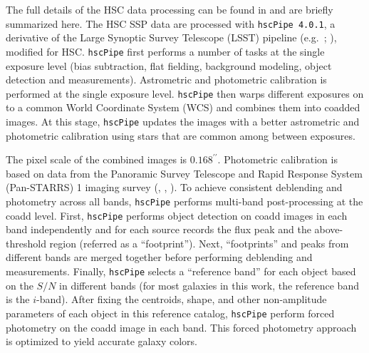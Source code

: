\documentclass{emulateapj}
\def\arcsec{{\prime\prime}}
\begin{document}
\begin{CJK*}{UTF8}{gbsn}
The full details of the HSC data processing can be found in \citet{BoschInPrep} and are briefly summarized here. The HSC SSP data are processed with \texttt{hscPipe 4.0.1}, a derivative of the Large 
    Synoptic Survey Telescope (LSST) pipeline (e.g.\ \citealt{Juric2015}; 
    \citealt{Axelrod2010}), modified for HSC. 
    \texttt{hscPipe} first performs a number of tasks at the single exposure level 
    (bias subtraction, flat fielding, background modeling, object detection and 
    measurements). Astrometric and photometric calibration is performed at the single exposure level. \texttt{hscPipe} then warps different exposures on to a common
    World Coordinate System (WCS) and combines them into coadded images. At this stage, \texttt{hscPipe} updates the images with a better astrometric and 
    photometric calibration using stars that are common among between exposures. 
    
    The pixel scale of the combined images is $0.168^{\arcsec}$. Photometric calibration is based on data from the Panoramic Survey Telescope 
    and Rapid Response System (Pan-STARRS) 1 imaging survey 
    (\citealt{Schlafly2012}, \citealt{Tonry2012}, \citealt{Magnier2013}). 
    To achieve consistent deblending and photometry across all bands, \texttt{hscPipe} 
    performs multi-band post-processing at the coadd level. First, \texttt{hscPipe} performs object detection on coadd images
    in each band independently and for each source records the flux peak and the above-threshold region (referred as 
    a ``footprint''). Next, ``footprints'' and peaks from different bands are merged together before performing deblending and measurements. Finally, \texttt{hscPipe} selects a ``reference band'' for each object based on the 
    $S/N$ in different bands (for most galaxies in this work, the reference band is the $i$-band). 
    After fixing the centroids, shape, and other non-amplitude parameters of each 
    object in this reference catalog, \texttt{hscPipe} perform forced photometry 
    on the coadd image in each band. This forced photometry approach is optimized to yield accurate galaxy colors. 
        

\end{CJK*}
\end{document}
